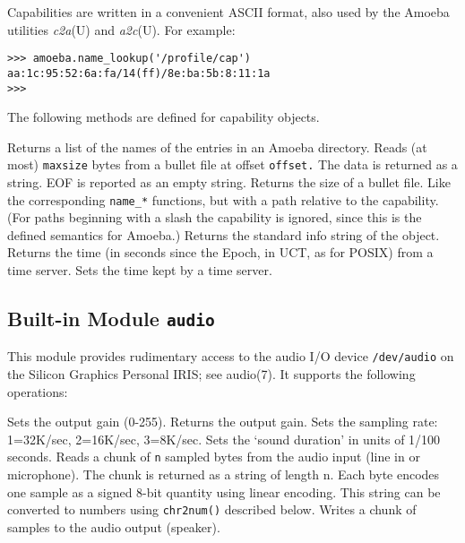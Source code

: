 Capabilities are written in a convenient ASCII format, also used by the
Amoeba utilities
{\em c2a}(U)
and
{\em a2c}(U).
For example:
\bcode\begin{verbatim}
>>> amoeba.name_lookup('/profile/cap')
aa:1c:95:52:6a:fa/14(ff)/8e:ba:5b:8:11:1a
>>> 
\end{verbatim}\ecode
The following methods are defined for capability objects.
\begin{description}
Returns a list of the names of the entries in an Amoeba directory.
Reads (at most)
{\tt maxsize}
bytes from a bullet file at offset
{\tt offset.}
The data is returned as a string.
EOF is reported as an empty string.
Returns the size of a bullet file.
\itembreak
Like the corresponding
{\tt name\_*}
functions, but with a path relative to the capability.
(For paths beginning with a slash the capability is ignored, since this
is the defined semantics for Amoeba.)
Returns the standard info string of the object.
Returns the time (in seconds since the Epoch, in UCT, as for POSIX) from
a time server.
Sets the time kept by a time server.
\end{description}

\subsection{Built-in Module {\tt audio}}

This module provides rudimentary access to the audio I/O device
{\tt /dev/audio}
on the Silicon Graphics Personal IRIS; see audio(7).
It supports the following operations:
\begin{description}
Sets the output gain (0-255).
Returns the output gain.
Sets the sampling rate: 1=32K/sec, 2=16K/sec, 3=8K/sec.
Sets the `sound duration' in units of 1/100 seconds.
Reads a chunk of
{\tt n}
sampled bytes from the audio input (line in or microphone).
The chunk is returned as a string of length n.
Each byte encodes one sample as a signed 8-bit quantity using linear
encoding.
This string can be converted to numbers using {\tt chr2num()} described
below.
Writes a chunk of samples to the audio output (speaker).
\end{description}

